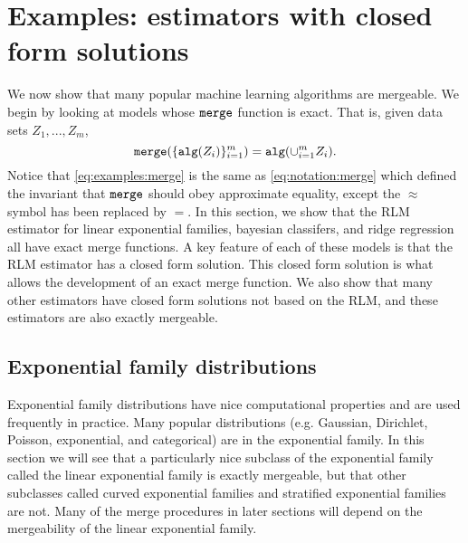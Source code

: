 \documentclass[thesis.tex]{subfiles}
\newcommand{\merge}{\mkprocedure{merge}}
\newcommand{\alg}{\mkprocedure{alg}}
\begin{document}

\section{Examples: estimators with closed form solutions}

We now show that many popular machine learning algorithms are mergeable.
We begin by looking at models whose $\merge$ function is exact.
That is, given data sets $Z_1,...,Z_m$,
\begin{equation}
    \label{eq:examples:merge}
    \merge(\{\alg(Z_i)\}_{i=1}^m) = \alg(\cup_{i=1}^m Z_i)
    .
\end{equation}
Notice that \eqref{eq:examples:merge} is the same as \eqref{eq:notation:merge} which defined the invariant that $\merge$ should obey approximate equality,
except the $\approx$ symbol has been replaced by $=$.
In this section, we show that the RLM estimator for linear exponential families, bayesian classifers, and ridge regression all have exact merge functions.
A key feature of each of these models is that the RLM estimator has a closed form solution.
This closed form solution is what allows the development of an exact merge function.
We also show that many other estimators have closed form solutions not based on the RLM,
and these estimators are also exactly mergeable.


\subsection{Exponential family distributions}
\label{sec:merge:ef}


Exponential family distributions have nice computational properties and are used frequently in practice.
Many popular distributions (e.g. Gaussian, Dirichlet, Poisson, exponential, and categorical) are in the exponential family.
In this section we will see that a particularly nice subclass of the exponential family called the linear exponential family is exactly mergeable,
but that other subclasses called curved exponential families and stratified exponential families are not.
Many of the merge procedures in later sections will depend on the mergeability of the linear exponential family.
\end{document}
